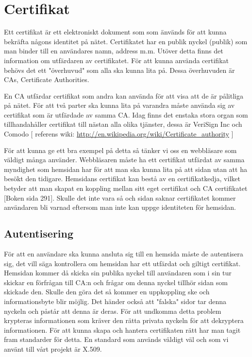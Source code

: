 \section{Certifikat}
Ett certifikat är ett elektroniskt dokument som som änvänds för att kunna bekräfta någons identitet på nätet. Certifikatet har en publik nyckel (publik) som man binder till en användares namn, address m.m. 
Utöver detta finns det information om utfärdaren av certifikatet. 
För att kunna använda certifikat behövs det ett "överhuvud" som alla ska kunna lita på. 
Dessa överhuvuden är CAs, Certificate Authorities. 

En CA utfärdar certifikat som andra kan använda för att visa att de är pålitliga på nätet. För att två parter ska kunna lita på varandra måste använda sig av certifikat som är utfärdade av samma CA. Idag finns det enstaka stora organ som tillhandahåller certifikat till nästan alla olika tjänster, dessa är VeriSign Inc och Comodo  [ referens wiki: \url{http://en.wikipedia.org/wiki/Certificate_authority} ]

För att kunna ge ett bra exempel på detta så tänker vi oss en webbläsare som väldigt många använder. Webbläsaren måste ha ett certifikat utfärdat av samma myndighet som hemsidan har för att man ska kunna lita på att sidan utan att ha besökt den tidigare. Hemsidans certifikat kan bestå av en certifikatkedja, vilket betyder att man skapat en koppling mellan sitt eget certifikat och CA certifikatet [Boken sida 291]. Skulle det inte vara så och sidan saknar certifikatet kommer användaren bli varnad eftersom man inte kan uppge identiteten för hemsidan.

\subsection{Autentisering}
För att en användare ska kunna ansluta sig till en hemsida måste de autentisera sig, det vill säga kontrollera om hemsidan har ett utfärdat och giltigt certifikat. Hemsidan kommer då skicka sin publika nyckel till användaren som i sin tur skickar en förfrågan till CA:n och frågar om denna nyckel tillhör sidan som skickade den. Skulle den göra det så kommer en uppkoppling ske och informationsbyte blir möjlig.
Det händer också att "falska" sidor tar denna nyckeln och påstår att denna är deras. För att undkomma detta problem krypteras informationen som kräver den rätta privata nyckeln för att dekryptera informationen.
För att kunna skapa och hantera certifikaten rätt har man tagit fram standarder för detta. En standard som används väldigt väl och som vi använt till vårt projekt är X.509.

